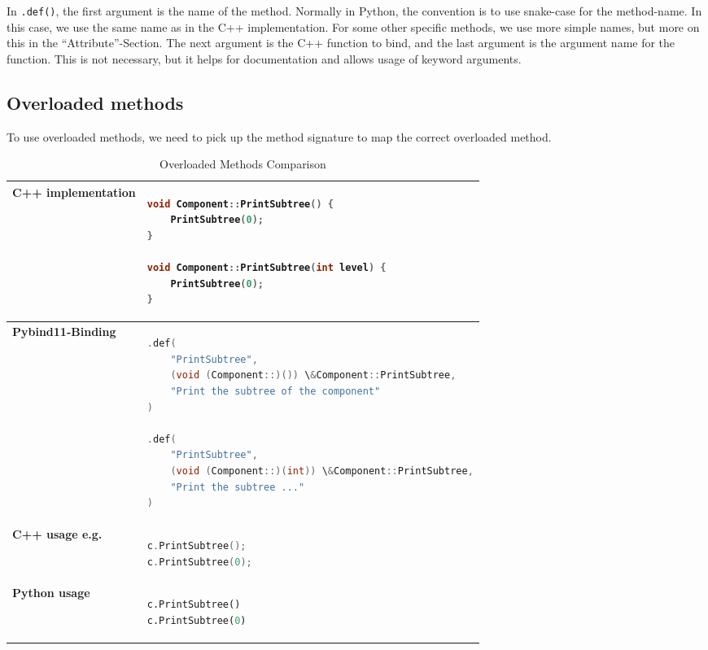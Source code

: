 In \verb|.def()|, the first argument is the name of the method. Normally in Python, the convention is to use snake-case for the method-name. In this case, we use the same name as in the C++ implementation. For some other specific methods, we use more simple names, but more on this in the “Attribute”-Section. The next argument is the C++ function to bind, and the last argument is the argument name for the function. This is not necessary, but it helps for documentation and allows usage of keyword arguments.

\subsection{Overloaded methods}

To use overloaded methods, we need to pick up the method signature to map the correct overloaded method.
\newpage
\begin{table}[htbp]
\centering
\begin{tabular}{|l|l|}
\hline
\textbf{C++ implementation} &
\begin{lstlisting}[language=C++]
void Component::PrintSubtree() {
    PrintSubtree(0);
}

void Component::PrintSubtree(int level) {
    PrintSubtree(0);
}
\end{lstlisting}
\\ \hline
\textbf{Pybind11-Binding} &
\begin{lstlisting}[language=C++]
.def(
    "PrintSubtree",
    (void (Component::)()) \&Component::PrintSubtree,
    "Print the subtree of the component"
)

.def(
    "PrintSubtree",
    (void (Component::)(int)) \&Component::PrintSubtree,
    "Print the subtree ..."
)
\end{lstlisting}
\\ \hline
\textbf{C++ usage e.g.} &
\begin{lstlisting}[language=C++]
c.PrintSubtree();
c.PrintSubtree(0);
\end{lstlisting}
\\ \hline
\textbf{Python usage} &
\begin{lstlisting}[language=Python]
c.PrintSubtree()
c.PrintSubtree(0)
\end{lstlisting}
\\ \hline
\end{tabular}
\caption{Overloaded Methods Comparison}
\label{tab:overloaded_methods}
\end{table}

